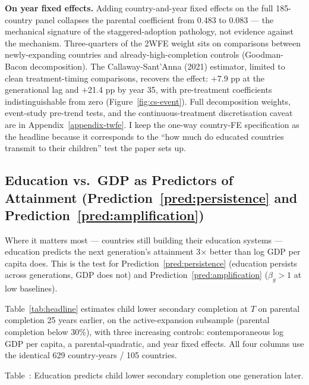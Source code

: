 \documentclass[12pt,letterpaper]{article}
\begin{document}
\textbf{On year fixed effects.} Adding country-and-year fixed effects
on the full 185-country panel collapses the parental coefficient from
0.483 to 0.083 --- the mechanical signature of the staggered-adoption
pathology, not evidence against the mechanism. Three-quarters of the
2WFE weight sits on comparisons between newly-expanding countries and
already-high-completion controls (Goodman-Bacon decomposition). The
Callaway-Sant'Anna (2021) estimator, limited to clean treatment-timing
comparisons, recovers the effect: $+$7.9 pp at the generational lag
and $+$21.4 pp by year 35, with pre-treatment coefficients
indistinguishable from zero (Figure~\ref{fig:cs-event}). Full
decomposition weights, event-study pre-trend tests, and the
continuous-treatment discretisation caveat are in
Appendix~\ref{appendix-twfe}. I keep the one-way country-FE
specification as the headline because it corresponds to the ``how much
do educated countries transmit to their children'' test the paper sets
up.

\subsection{Education vs.\ GDP as Predictors of Attainment (Prediction~\ref{pred:persistence} and Prediction~\ref{pred:amplification})}\label{education-vs-gdp-as-predictors-of-attainment}

Where it matters most --- countries still building their education systems --- education predicts the next generation's attainment 3× better than log GDP per capita does. This is the test for Prediction~\ref{pred:persistence} (education persists across generations, GDP does not) and Prediction~\ref{pred:amplification} ($\beta_g > 1$ at low baselines).

Table~\ref{tab:headline} estimates child lower secondary completion at $T$
on parental completion 25 years earlier, on the active-expansion
subsample (parental completion below 30\%), with three increasing
controls: contemporaneous log GDP per capita, a parental-quadratic,
and year fixed effects. All four columns use the identical 629
country-years / 105 countries.

\label{tab:headline}Table~\thetable: Education predicts child lower secondary completion one generation later.
\end{document}
